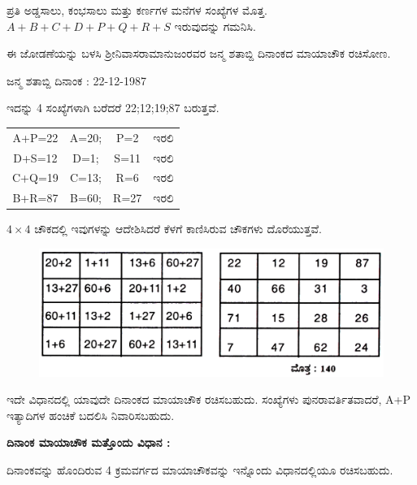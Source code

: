 ಪ್ರತಿ ಅಡ್ಡಸಾಲು, ಕಂಭಸಾಲು ಮತ್ತು ಕರ್ಣಗಳ ಮನೆಗಳ ಸಂಖ್ಯೆಗಳ ಮೊತ್ತ. $A+B+C+ D+ P+ Q+ R+ S$ ಇರುವುದನ್ನು ಗಮನಿಸಿ.

ಈ ಜೋಡಣೆಯನ್ನು ಬಳಸಿ ಶ್ರೀನಿವಾಸರಾಮಾನುಜಂರವರ ಜನ್ಮ ಶತಾಬ್ದಿ ದಿನಾಂಕದ ಮಾಯಾಚೌಕ ರಚಿಸೋಣ.

ಜನ್ಮ ಶತಾಬ್ದಿ ದಿನಾಂಕ : 22-12-1987

ಇದನ್ನು 4 ಸಂಖ್ಯೆಗಳಾಗಿ ಬರೆದರೆ 22;12;19;87 ಬರುತ್ತವೆ.

\begin{tabular}{cccc}
A+P=22 & A=20; & P=2 & ಇರಲಿ\\
D+S=12 & D=1; & S=11 & ಇರಲಿ\\
C+Q=19 & C=13; & R=6 & ಇರಲಿ\\
B+R=87 & B=60; & R=27 & ಇರಲಿ
\end{tabular}

\smallskip

$4 \times 4$ ಚೌಕದಲ್ಲಿ ಇವುಗಳನ್ನು ಆದೇಶಿಸಿದರೆ ಕೆಳಗೆ ಕಾಣಿಸಿರುವ ಚೌಕಗಳು ದೊರೆಯುತ್ತವೆ.
\begin{figure}[H]
\includegraphics[scale=.9]{src/figures/chap3/fig3.45.jpg}
\end{figure}

ಇದೇ ವಿಧಾನದಲ್ಲಿ ಯಾವುದೇ ದಿನಾಂಕದ ಮಾಯಾಚೌಕ ರಚಿಸಬಹುದು. ಸಂಖ್ಯೆಗಳು ಪುನರಾವರ್ತಿತವಾದರೆ, A+P ಇತ್ಯಾದಿಗಳ ಹಂಚಿಕೆ ಬದಲಿಸಿ ನಿವಾರಿಸಬಹುದು.

\textbf{ದಿನಾಂಕ ಮಾಯಾಚೌಕ ಮತ್ತೊಂದು ವಿಧಾನ :}

ದಿನಾಂಕವನ್ನು ಹೊಂದಿರುವ 4 ಕ್ರಮವರ್ಗದ ಮಾಯಾಚೌಕವನ್ನು ಇನ್ನೊಂದು ವಿಧಾನದಲ್ಲಿಯೂ ರಚಿಸಬಹುದು.

